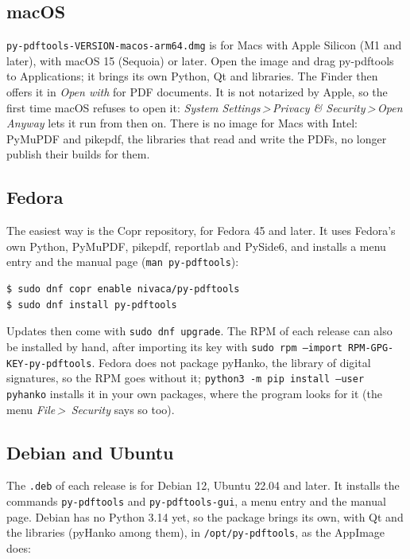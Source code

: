 \documentclass[12pt,
              article,
              oneside
              ]{memoir}
\newcommand*{\menu}[1]{\textit{#1}}
\newcommand*{\then}{\,>\,}
\begin{document}
\subsection{macOS}

%
\texttt{py-pdftools-VERSION-macos-arm64.dmg} is for Macs with Apple
Silicon (M1 and later), with macOS 15 (Sequoia) or later. Open the image
and drag py-pdftools to Applications; it brings its own Python, Qt and
libraries. The Finder then offers it in \menu{Open with} for PDF
documents. It is not notarized by Apple, so the first time macOS refuses
to open it: \menu{System Settings\then Privacy \& Security\then Open
Anyway} lets it run from then on. There is no image for Macs with Intel:
PyMuPDF and pikepdf, the libraries that read and write the PDFs, no longer
publish their builds for them.

\subsection{Fedora}

%
The easiest way is the Copr repository, for Fedora 45 and later. It uses
Fedora's own Python, PyMuPDF, pikepdf, reportlab and PySide6, and installs
a menu entry and the manual page (\texttt{man py-pdftools}):

\begin{verbatim}
$ sudo dnf copr enable nivaca/py-pdftools
$ sudo dnf install py-pdftools
\end{verbatim}

\noindent{}%
Updates then come with \texttt{sudo dnf upgrade}. The RPM of
each release can also be installed by hand, after importing its key with
\texttt{sudo rpm --import RPM-GPG-KEY-py-pdftools}. Fedora does not package
pyHanko, the library of digital signatures, so the RPM goes without it;
\texttt{python3 -m pip install --user pyhanko} installs it in your own
packages, where the program looks for it (the menu \menu{File\then
Security} says so too).

\subsection{Debian and Ubuntu}

%
The \texttt{.deb} of each release is for Debian 12, Ubuntu 22.04 and
later. It installs the commands \texttt{py-pdftools} and
\texttt{py-pdftools-gui}, a menu entry and the manual page. Debian has no
Python 3.14 yet, so the package brings its own, with Qt and the libraries
(pyHanko among them), in \texttt{/opt/py-pdftools}, as the AppImage does:
\end{document}
